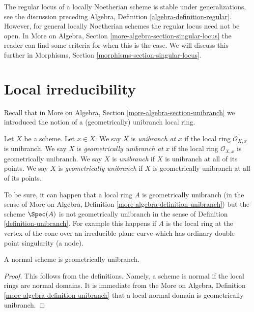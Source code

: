 \noindent
The regular locus of a locally Noetherian scheme is stable under
generalizations, see the discussion preceding
Algebra, Definition \ref{algebra-definition-regular}.
However, for general locally Noetherian schemes the regular locus
need not be open. In
More on Algebra, Section \ref{more-algebra-section-singular-locus}
the reader can find some criteria for when this is the case.
We will discuss this further in
Morphisms, Section \ref{morphisms-section-singular-locus}.






\section{Local irreducibility}
\label{section-unibranch}

\noindent
Recall that in More on Algebra, Section \ref{more-algebra-section-unibranch}
we introduced the notion of a (geometrically) unibranch local ring.

\begin{definition}
\label{definition-unibranch}
\begin{reference}
\cite[Chapter IV (6.15.1)]{EGA4}
\end{reference}
Let $X$ be a scheme. Let $x \in X$. We say $X$ is {\it unibranch at $x$}
if the local ring $\mathcal{O}_{X, x}$ is unibranch. We say $X$ is
{\it geometrically unibranch at $x$}
if the local ring $\mathcal{O}_{X, x}$ is geometrically unibranch.
We say $X$ is {\it unibranch} if $X$ is unibranch at all of its points.
We say $X$ is {\it geometrically unibranch} if $X$ is
geometrically unibranch at all of its points.
\end{definition}

\noindent
To be sure, it can happen that a local ring $A$ is geometrically unibranch
(in the sense of
More on Algebra, Definition \ref{more-algebra-definition-unibranch})
but the scheme $\Spec(A)$ is not geometrically unibranch in the sense
of Definition \ref{definition-unibranch}. For example this happens
if $A$ is the local ring at the vertex of the cone over an irreducible
plane curve which has ordinary double point singularity (a node).

\begin{lemma}
\label{lemma-normal-geometrically-unibranch}
A normal scheme is geometrically unibranch.
\end{lemma}

\begin{proof}
This follows from the definitions. Namely, a scheme
is normal if the local rings are normal domains. It is immediate
from the More on Algebra, Definition \ref{more-algebra-definition-unibranch}
that a local normal domain is geometrically unibranch.
\end{proof}

